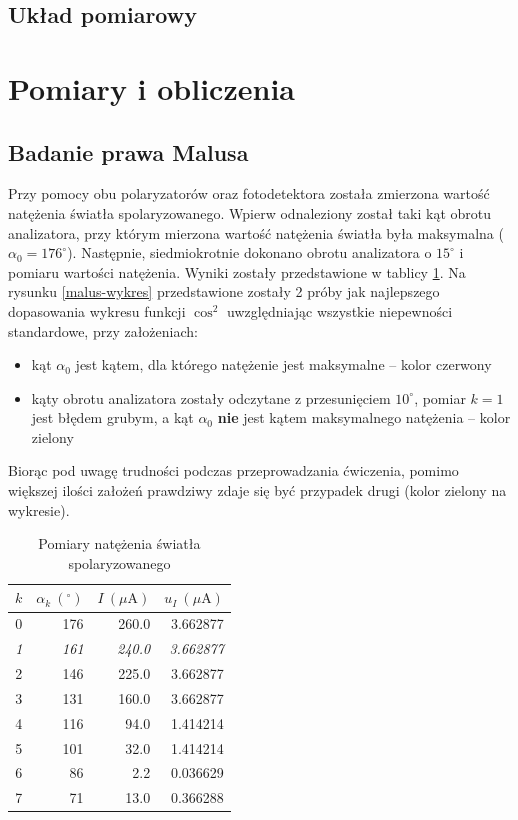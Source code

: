 \documentclass[a4paper]{article}
\begin{document}
\subsection{Układ pomiarowy}



\section{Pomiary i obliczenia}
\subsection{Badanie prawa Malusa}
Przy pomocy obu polaryzatorów oraz fotodetektora została zmierzona wartość natężenia światła spolaryzowanego.
Wpierw odnaleziony został taki kąt obrotu analizatora, przy którym mierzona wartość natężenia światła była maksymalna ($\alpha_0 = 176^\circ$).
Następnie, siedmiokrotnie dokonano obrotu analizatora o $15^\circ$ i pomiaru wartości natężenia.
Wyniki zostały przedstawione w tablicy \ref{malus-pomiary}. 
Na rysunku \ref{malus-wykres} przedstawione zostały 2 próby jak najlepszego dopasowania wykresu funkcji $\cos^2$ uwzględniając wszystkie niepewności standardowe, przy założeniach:
\begin{itemize}
	\item kąt $\alpha_0$ jest kątem, dla którego natężenie jest maksymalne -- kolor czerwony
	\item kąty obrotu analizatora zostały odczytane z przesunięciem $10^\circ$, pomiar $k=1$ jest błędem grubym, a kąt $\alpha_0$ \textbf{nie} jest kątem maksymalnego natężenia -- kolor zielony
\end{itemize}

Biorąc pod uwagę trudności podczas przeprowadzania ćwiczenia, pomimo większej ilości założeń prawdziwy zdaje się być przypadek drugi (kolor zielony na wykresie).


\begin{table}[h]
\centering
\begin{tabular}{rrrr}
\toprule
 $k$ &  $\alpha_k \ ({}^\circ)$ &  $I \ (\mu\text{A})$ &  $u_I \ (\mu \text{A})$ \\
\midrule
 0 &       176 &   260.0 &         3.662877 \\
 \textit{1} & 	   \textit{161} &   \textit{240.0} &         \textit{3.662877} \\
 2 &       146 &   225.0 &         3.662877 \\
 3 &       131 &   160.0 &         3.662877 \\
 4 &       116 &    94.0 &         1.414214 \\
 5 &       101 &    32.0 &         1.414214 \\
 6 &        86 &     2.2 &         0.036629 \\
 7 &        71 &    13.0 &         0.366288 \\
\bottomrule
\end{tabular}
\caption{Pomiary natężenia światła spolaryzowanego}
\label{malus-pomiary}
\end{table}
\end{document}
